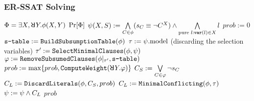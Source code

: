 \begin{frame}
    \frametitle{ER-SSAT Solving}
    {\scriptsize
        \begin{algorithmic}[1]
            \REQUIRE $\Qf=\exists X,\random{} Y.\pf(X,Y)$
            \ENSURE $\Pr[\Phi]$
            \STATE $\psi(X,S) := \bigwedge\limits_{C\in\phi}(s_{C}\equiv\lnot C^X)\land\bigwedge\limits_{\text{pure }l: \texttt{var}(l)\in X}l$\label{code:erssat-init-select}
            \STATE $prob := 0$
            \STATE $\texttt{s-table} := \texttt{BuildSubsumptionTable}(\phi)$\label{code:erssat-subsume-table}
            \WHILE{($\sat{\select}$)}
            \STATE $\tau := \psi.\mathrm{model}$ (discarding the selection variables)
            \IF{($\sat{\pcf{\pf}{\as}}$)}
            \STATE $\tau' := \texttt{SelectMinimalClauses}(\phi,\psi)$\label{code:erssat-minimal-clauses}
            \STATE $\varphi := \texttt{RemoveSubsumedClauses}(\phi|_{\tau'},\texttt{s-table})$\label{code:erssat-subsume-clauses}
            \STATE $prob := \max\{prob,\texttt{ComputeWeight}(\random{} Y.\varphi)\}$\label{code:erssat-wmc}
            \STATE $C_S := \bigvee\limits_{C\in\varphi}\lnot s_{C}$
            \STATE $C_L := \texttt{DiscardLiterals}(\phi,C_S,prob)$\label{code:erssat-discard-literals}
            \ELSE
            \STATE $C_L := \texttt{MinimalConflicting}(\phi,\tau)$
            \ENDIF
            \STATE $\psi := \psi \land C_L$
            \ENDWHILE
            \RETURN $prob$
        \end{algorithmic}
    }
\end{frame}

